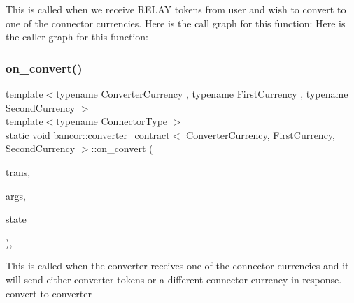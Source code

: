 This is called when we receive R\+E\+L\+AY tokens from user and wish to convert to one of the connector currencies. Here is the call graph for this function\+:
Here is the caller graph for this function\+:
\mbox{\label{classbancor_1_1converter__contract_af868857d116887b596094fec4a4cb1e3}} 
\subsubsection{\texorpdfstring{on\+\_\+convert()}{on\_convert()}\hspace{0.1cm}{\footnotesize\ttfamily [2/2]}}
{\footnotesize\ttfamily template$<$typename Converter\+Currency , typename First\+Currency , typename Second\+Currency $>$ \\
template$<$typename Connector\+Type $>$ \\
static void \mbox{\hyperlink{classbancor_1_1converter__contract}{bancor\+::converter\+\_\+contract}}$<$ Converter\+Currency, First\+Currency, Second\+Currency $>$\+::on\+\_\+convert (\begin{DoxyParamCaption}\item[{const typename Connector\+Type\+::currency\+\_\+type\+::transfer \&}]{trans,  }\item[{const \mbox{\hyperlink{structbancor_1_1converter__contract_1_1converter__args}{converter\+\_\+args}} \&}]{args,  }\item[{\mbox{\hyperlink{structbancor_1_1converter__contract_1_1converter__state}{converter\+\_\+state}} \&}]{state }\end{DoxyParamCaption})\hspace{0.3cm}{\ttfamily [inline]}, {\ttfamily [static]}}

This is called when the converter receives one of the connector currencies and it will send either converter tokens or a different connector currency in response. convert to converter \mbox{\label{classbancor_1_1converter__contract_ab04abf8e1d02393ddbc9b09b5b5a5be1}} 
